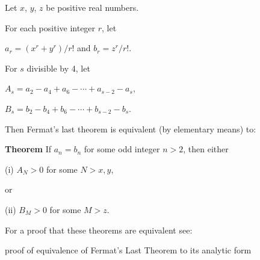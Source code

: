 \documentclass[12pt]{article}
\begin{document}
Let $x$, $y$, $z$ be positive real numbers.

For each positive integer $r$, let

$a_r = (x^r+y^r)/r!$ and $b_r=z^r/r!$.

For $s$ divisible by 4, let

$A_s=a_2-a_4+a_6- \cdots +a_{s-2}-a_s$,

$B_s=b_2-b_4+b_6- \cdots +b_{s-2}-b_s$.

Then Fermat's last theorem is equivalent (by elementary means) to: 

{\bf Theorem} If $a_n=b_n$ for some odd integer $n>2$, then either

(i) $A_N > 0$ for some $N>x,y$,

\hspace{2mm} or

(ii) $B_M>0$ for some $M>z$.

For a proof that these theorems are equivalent see:

proof of equivalence of Fermat's Last Theorem to its analytic form
\end{document}
